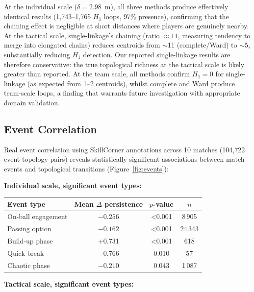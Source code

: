 At the individual scale (\(\delta=2.98\)~m), all three methods produce effectively identical results (1,743--1,765 \(H_1\) loops, 97\% presence), confirming that the chaining effect is negligible at short distances where players are genuinely nearby. At the tactical scale, single-linkage's chaining (ratio \(\approx 11\), measuring tendency to merge into elongated chains) reduces centroids from \(\sim\)11 (complete/Ward) to \(\sim\)5, substantially reducing \(H_1\) detection. Our reported single-linkage results are therefore conservative: the true topological richness at the tactical scale is likely greater than reported. At the team scale, all methods confirm \(H_1=0\) for single-linkage (as expected from 1--2 centroids), whilst complete and Ward produce team-scale loops, a finding that warrants future investigation with appropriate domain validation.

\subsection{Event Correlation}

Real event correlation using SkillCorner annotations across 10 matches (104,722 event-topology pairs) reveals statistically significant associations between match events and topological transitions (Figure~\ref{fig:events}):

\textbf{Individual scale, significant event types:}

\begin{table}[H]
  \centering
  \begin{tabular}{@{}lccc@{}}
    \toprule
    Event type & Mean \(\Delta\) persistence & \(p\)-value & \(n\) \\
    \midrule
    On-ball engagement & \(-0.256\) & \textless0.001 & 8\,905 \\
    Passing option     & \(-0.162\) & \textless0.001 & 24\,343 \\
    Build-up phase       & +0.731 & \textless0.001 & 618 \\
    Quick break          & \(-0.766\) & 0.010 & 57 \\
    Chaotic phase        & \(-0.210\) & 0.043 & 1\,087 \\
    \bottomrule
  \end{tabular}
\end{table}

\textbf{Tactical scale, significant event types:}

